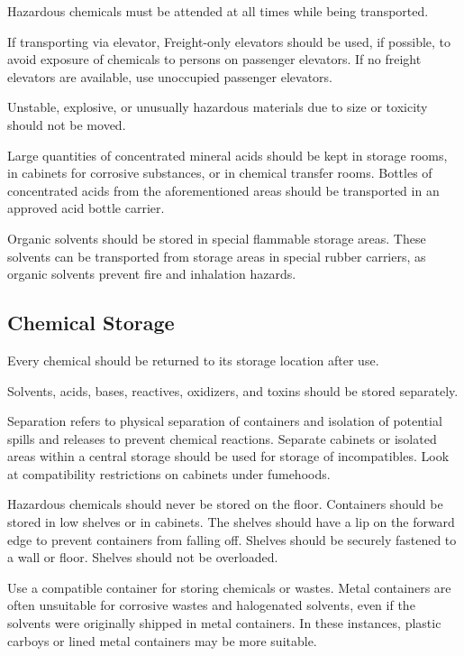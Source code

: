 \documentclass[12pt]{../SOP4_alpha}\usepackage[]{graphicx}\usepackage[]{color}
\begin{document}
\NP Hazardous chemicals must be attended at all times while being transported.

\NP If transporting via elevator, Freight-only elevators should be used, if possible, to avoid exposure of chemicals to persons on passenger elevators. If no freight elevators are available, use unoccupied passenger elevators.  

\NP Unstable, explosive, or unusually hazardous materials due to size or toxicity should not be moved. 

\NP Large quantities of concentrated mineral acids should be kept in storage rooms, in cabinets for corrosive substances, or in chemical transfer rooms. Bottles of concentrated acids from the aforementioned areas should be transported in an approved acid bottle carrier. 

\NP Organic solvents should be stored in special flammable storage areas. These solvents can be transported from storage areas in special rubber carriers, as organic solvents prevent fire and inhalation hazards. 

\subsection*{Chemical Storage}

\NP Every chemical should be returned to its storage location after use. 

\NP Solvents, acids, bases, reactives, oxidizers, and toxins should be stored separately.

\NP Separation refers to physical separation of containers and isolation of potential spills and releases to prevent chemical reactions. Separate cabinets or isolated areas within a central storage should be used for storage of incompatibles. Look at compatibility restrictions on cabinets under fumehoods. 

\NP Hazardous chemicals should never be stored on the floor. Containers should be stored in low shelves or in cabinets. The shelves should have a lip on the forward edge to prevent containers from falling off. Shelves should be securely fastened to a wall or floor. Shelves should not be overloaded.

\NP Use a compatible container for storing chemicals or wastes. Metal containers are often unsuitable for corrosive wastes and halogenated solvents, even if the solvents were originally shipped in metal containers. In these instances, plastic carboys or lined metal containers may be more suitable. 
\end{document}
